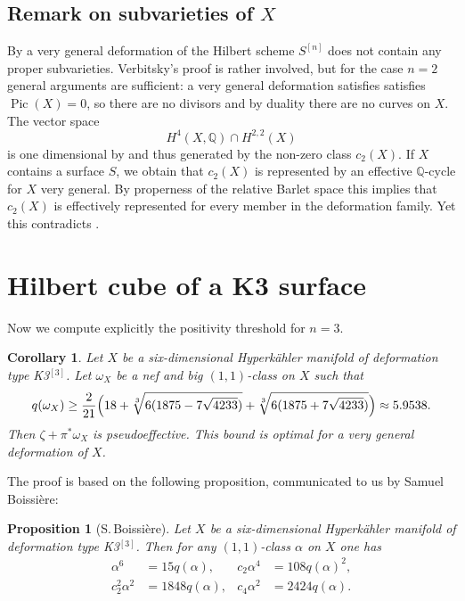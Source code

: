 \documentclass[JEP,XML,SOM,Unicode,NoEqCountersInSection,published]{cedram}
\theoremstyle{plain}
\newtheorem{corollary}[theorem]{Corollary}
\newtheorem{proposition}[theorem]{Proposition}
\theoremstyle{definition}
\newcommand{\Q}{\ensuremath{\mathbb{Q}}}
\DeclareMathOperator{\pic}{Pic}
\begin{document}
\subsection{Remark on subvarieties of $X$}

By \cite[Th.\,1.1]{Ver98} a very general deformation of the Hilbert scheme $S^{[n]}$
does not contain any proper subvarieties. Verbitsky's proof is rather involved,
but for the case $n=2$ general arguments are sufficient:
a very general deformation satisfies satisfies $\pic(X)=0$, so there are no
divisors and by duality there are no curves on $X$.
The vector space
\[
H^4(X,\Q) \cap H^{2,2}(X)
\]
is one dimensional by \cite[Table\,B.1]{Zha15} and thus generated by the non-zero class $c_2(X)$.
If $X$ contains a surface $S$, we obtain that $c_2(X)$ is represented by an effective $\Q$-cycle for $X$ very general.
By properness of the relative Barlet space \cite[Th.\,4.3]{Fujiki78} this implies that $c_2(X)$ is effectively
represented for every member in the deformation family. Yet this contradicts \cite[Prop.\,2]{Ott15}.

\section{Hilbert cube of a K3 surface}

Now we compute explicitly the positivity threshold for $n=3$.

\begin{corollary} \label{corollaryK3cube}
Let $X$ be a six-dimensional Hyperkähler manifold of deformation type K3$^{[3]}$.
Let $\omega_X$ be a nef and big $(1,1)$-class on $X$ such that
\[
q(\omega_X)\geq \frac{2}{21}\Bigl(18+\sqrt[3]{6(1875-7\sqrt{4233})}+\sqrt[3]{6(1875+7\sqrt{4233})}\Bigr) \approx 5.9538.
\]
Then $\zeta+\pi^*\omega_X$ is pseudoeffective.
This bound is optimal for a very general deformation of $X$.
\end{corollary}

The proof is based on the following proposition, communicated to us by Samuel Boissière:

\begin{proposition}[S.\,Boissière] \label{propositionK3cube}
Let $X$ be a six-dimensional Hyperkähler manifold of deformation type K3$^{[3]}$. Then for any $(1,1)$-class
$\alpha$ on $X$ one has
\begin{align*}
\alpha^6&=15q(\alpha), & c_2 \alpha^4&=108q(\alpha)^2,
\\
c_2^2 \alpha^2&=1848 q(\alpha), & c_4 \alpha^2&=2424 q(\alpha).
\end{align*}
\end{proposition}
\end{document}
